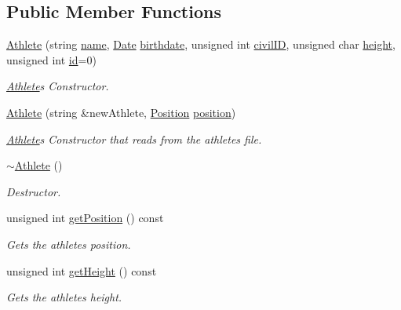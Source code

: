 \subsection*{Public Member Functions}
\begin{DoxyCompactItemize}
\item 
\hyperlink{class_athlete_ae606aa946830e5ea0a05bf8f4fe22132}{Athlete} (string \hyperlink{class_worker_a66cf57341253a31e418cf8abad59ffb1}{name}, \hyperlink{class_date}{Date} \hyperlink{class_worker_a3c1845f40a084b471750a787a87614dd}{birthdate}, unsigned int \hyperlink{class_worker_adfafba55f967994f4595bd914bbba127}{civil\+ID}, unsigned char \hyperlink{class_athlete_a80a64bb1d5c943aaa7ca152d596d9914}{height}, unsigned int \hyperlink{class_worker_afc39287cd510977cfe7697ed2c86b2ca}{id}=0)
\begin{DoxyCompactList}\small\item\em \hyperlink{class_athlete}{Athlete}\textquotesingle{}s Constructor. \end{DoxyCompactList}\item 
\hyperlink{class_athlete_a47d08c02239cf9dec64223ddf7e133fe}{Athlete} (string \&new\+Athlete, \hyperlink{_utils_8hpp_ab91b34ae619fcdfcba4522b4f335bf83}{Position} \hyperlink{class_athlete_ab6c8f0df2238999ed76e563510ac0b38}{position})
\begin{DoxyCompactList}\small\item\em \hyperlink{class_athlete}{Athlete}\textquotesingle{}s Constructor that reads from the athlete\textquotesingle{}s file. \end{DoxyCompactList}\item 
\hyperlink{class_athlete_a8afd915bce6c257a4f512c97fe42a518}{$\sim$\+Athlete} ()
\begin{DoxyCompactList}\small\item\em Destructor. \end{DoxyCompactList}\item 
unsigned int \hyperlink{class_athlete_a18ca289d50900c3825f21d36f2bf8d75}{get\+Position} () const
\begin{DoxyCompactList}\small\item\em Gets the athlete\textquotesingle{}s position. \end{DoxyCompactList}\item 
unsigned int \hyperlink{class_athlete_a54a75ed3943dc6b5e229997be8422466}{get\+Height} () const
\begin{DoxyCompactList}\small\item\em Gets the athlete\textquotesingle{}s height. \end{DoxyCompactList}\item 

\end{DoxyCompactItemize}

